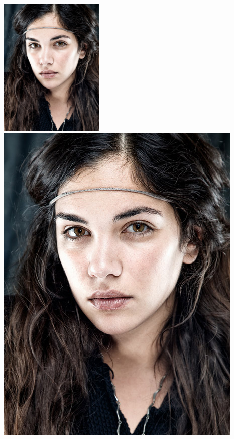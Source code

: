 \documentclass{article}
\begin{document}
\includegraphics[width=5cm,scale=0.5]{./images/amato}
\includegraphics[scale=0.5,scale=0.2]{./images/amato}
\end{document}
